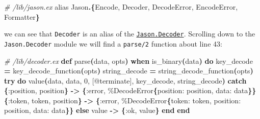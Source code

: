 \documentclass[
  oneside]{book}
\newenvironment{Shaded}{\begin{snugshade}}{\end{snugshade}}
\newcommand{\CommentTok}[1]{\textcolor[rgb]{0.56,0.35,0.01}{\textit{#1}}}
\newcommand{\ConstantTok}[1]{\textcolor[rgb]{0.56,0.35,0.01}{#1}}
\newcommand{\ControlFlowTok}[1]{\textcolor[rgb]{0.13,0.29,0.53}{\textbf{#1}}}
\newcommand{\DecValTok}[1]{\textcolor[rgb]{0.00,0.00,0.81}{#1}}
\newcommand{\FunctionTok}[1]{\textcolor[rgb]{0.13,0.29,0.53}{\textbf{#1}}}
\newcommand{\ImportTok}[1]{#1}
\newcommand{\KeywordTok}[1]{\textcolor[rgb]{0.13,0.29,0.53}{\textbf{#1}}}
\newcommand{\NormalTok}[1]{#1}
\newcommand{\OperatorTok}[1]{\textcolor[rgb]{0.81,0.36,0.00}{\textbf{#1}}}
\newcommand{\OtherTok}[1]{\textcolor[rgb]{0.56,0.35,0.01}{#1}}
\newcommand{\VariableTok}[1]{\textcolor[rgb]{0.00,0.00,0.00}{#1}}
\begin{document}
\begin{Shaded}
\begin{Highlighting}[]
\CommentTok{\# /lib/jason.ex}
\ImportTok{alias} \ConstantTok{Jason}\OperatorTok{.}\FunctionTok{\{}\ConstantTok{Encode}\NormalTok{, }\ConstantTok{Decoder}\NormalTok{, }\ConstantTok{DecodeError}\NormalTok{, }\ConstantTok{EncodeError}\NormalTok{, }\ConstantTok{Formatter}\FunctionTok{\}}
\end{Highlighting}
\end{Shaded}

we can see that \texttt{Decoder} is an alias of the \href{https://github.com/michalmuskala/jason/blob/master/lib/decoder.ex}{\texttt{Jason.Decoder}}. Scrolling down to the \texttt{Jason.Decoder} module we will find a \texttt{parse/2} function about line 43:

\begin{Shaded}
\begin{Highlighting}[]
  \CommentTok{\# /lib/decoder.ex}
  \KeywordTok{def}\NormalTok{ parse}\FunctionTok{(}\NormalTok{data, opts}\FunctionTok{)} \KeywordTok{when}\NormalTok{ is\_binary}\FunctionTok{(}\NormalTok{data}\FunctionTok{)} \KeywordTok{do}
\NormalTok{    key\_decode }\OperatorTok{=}\NormalTok{ key\_decode\_function}\FunctionTok{(}\NormalTok{opts}\FunctionTok{)}
\NormalTok{    string\_decode }\OperatorTok{=}\NormalTok{ string\_decode\_function}\FunctionTok{(}\NormalTok{opts}\FunctionTok{)}
    \ControlFlowTok{try} \KeywordTok{do}
\NormalTok{      value}\FunctionTok{(}\NormalTok{data, data, }\DecValTok{0}\NormalTok{, }\OtherTok{[@terminate]}\NormalTok{, key\_decode, string\_decode}\FunctionTok{)}
    \ControlFlowTok{catch}
      \FunctionTok{\{}\VariableTok{:position}\NormalTok{, position}\FunctionTok{\}} \OperatorTok{{-}\textgreater{}}
        \FunctionTok{\{}\VariableTok{:error}\NormalTok{, \%}\ConstantTok{DecodeError}\FunctionTok{\{}\VariableTok{position:}\NormalTok{ position, }\VariableTok{data:}\NormalTok{ data}\FunctionTok{\}\}}
      \FunctionTok{\{}\VariableTok{:token}\NormalTok{, token, position}\FunctionTok{\}} \OperatorTok{{-}\textgreater{}}
        \FunctionTok{\{}\VariableTok{:error}\NormalTok{, \%}\ConstantTok{DecodeError}\FunctionTok{\{}\VariableTok{token:}\NormalTok{ token, }\VariableTok{position:}\NormalTok{ position, }\VariableTok{data:}\NormalTok{ data}\FunctionTok{\}\}}
    \ControlFlowTok{else}
\NormalTok{      value }\OperatorTok{{-}\textgreater{}}
        \FunctionTok{\{}\VariableTok{:ok}\NormalTok{, value}\FunctionTok{\}}
    \KeywordTok{end}
  \KeywordTok{end}
\end{Highlighting}
\end{Shaded}
\end{document}

